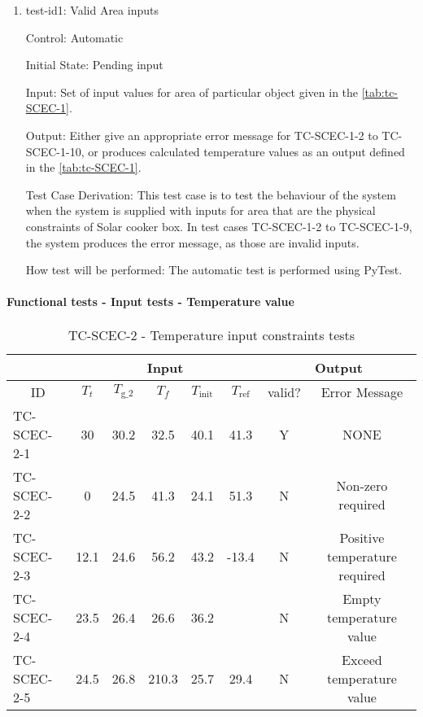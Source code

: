 \documentclass[12pt, titlepage]{article}
\begin{document}
\begin{enumerate}

\item{test-id1: Valid Area inputs  \\}

Control: Automatic
					
Initial State: Pending input 
					
Input: Set of input values for area of particular object given in the \autoref{tab:tc-SCEC-1}. 
					
Output: Either give an appropriate error message for TC-SCEC-1-2 to TC-SCEC-1-10, or produces calculated temperature values as an output defined in the \autoref{tab:tc-SCEC-1}. 

Test Case Derivation: This test case is to test the behaviour of the system when the system is supplied with inputs for area that are the physical constraints of Solar cooker box. In test cases TC-SCEC-1-2 to TC-SCEC-1-9, the system produces the error message, as those are invalid inputs.     
					
How test will be performed: The automatic test is performed using PyTest.  

\end{enumerate}

\paragraph{Functional tests - Input tests - Temperature value}


\begin{table}[h!]
\begin{center}
\begin{tabular}{ lccccccc }
\hline
\multicolumn{1}{l|}{}   & \multicolumn{5}{c|}{Input}                            & \multicolumn{2}{c}{Output} \\ 

\hline

\multicolumn{1}{c|}{ID} &   ${T_t}$   &   ${T_\text{g_2}}$  &  $T_f$ & ${T_\text{init}}$ &   \multicolumn{1}{c|}{${T_{\text{ref}}}$}   &   {valid?}   &   Error Message    \\ \hline

TC-SCEC-2-1   &   30  & 30.2 & 32.5   & 40.1  &  41.3    &  Y  & NONE                       \\
TC-SCEC-2-2   &   0  & 24.5  &  41.3  & 24.1  & 51.3     &  N  & Non-zero required           \\
TC-SCEC-2-3   &   12.1 & 24.6 & 56.2  & 43.2  & -13.4    &  N  & Positive temperature required      \\
TC-SCEC-2-4   &  23.5 & 26.4 & 26.6 & 36.2 & & N & Empty temperature value \\ 
TC-SCEC-2-5   &  24.5 & 26.8 & 210.3 & 25.7 & 29.4 & N & Exceed temperature value \\ 


\hline


\end{tabular}
\caption{TC-SCEC-2 - Temperature input constraints tests}
\label{tab:tc-SCEC-2}
\end{center}
\end{table}
\end{document}
